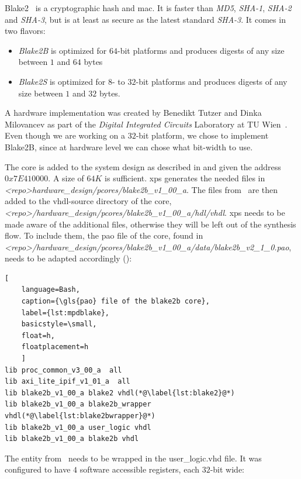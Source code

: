 Blake2~\cite{blake2} is a cryptographic hash and \gls{mac}. It is faster than
\emph{MD5}, \emph{SHA-1}, \emph{SHA-2} and \emph{SHA-3}, but is at least as
secure as the latest standard \emph{SHA-3}.
It comes in two flavors:
\begin{itemize}
	\item \emph{Blake2B} is optimized for $64$-bit platforms and produces
		digests of any size between $1$ and $64$ bytes
	\item \emph{Blake2S} is optimized for $8$- to $32$-bit platforms and
		produces digests of any size between $1$ and $32$ bytes.
\end{itemize}

A hardware implementation was created by Benedikt Tutzer and Dinka Milovancev as
part of the \emph{Digital Integrated Circuits} Laboratory at TU
Wien~\cite{blake2hardware}.
Even though we are working on a $32$-bit platform, we chose to implement
Blake2B, since at hardware level we can chose what bit-width to use.

The core is added to the system design as described in
 and given the address $0x7E410000$. A size of
$64K$ is sufficient.
\gls{xps} generates the needed files in
\emph{<repo>hardware\_design/pcores/blake2b\_v1\_00\_a}.
The files from~\cite{blake2hardware} are then added to the vhdl-source directory
of the core,\\
\emph{<repo>/hardware\_design/pcores/blake2b\_v1\_00\_a/hdl/vhdl}.
\gls{xps} needs to be made aware of the additional files, otherwise they will be
left out of the synthesis flow.
To include them, the \gls{pao} file of the core, found in
\emph{<repo>/hardware\_design/pcores/blake2b\_v1\_00\_a/data/blake2b_v2_1_0.pao},
needs to be adapted accordingly ():

\begin{lstlisting}[
	language=Bash,
	caption={\gls{pao} file of the blake2b core},
	label={lst:mpdblake},
	basicstyle=\small,
	float=h,
	floatplacement=h
	]
lib proc_common_v3_00_a  all 
lib axi_lite_ipif_v1_01_a  all 
lib blake2b_v1_00_a blake2 vhdl(*@\label{lst:blake2}@*)
lib blake2b_v1_00_a blake2b_wrapper vhdl(*@\label{lst:blake2bwrapper}@*)
lib blake2b_v1_00_a user_logic vhdl
lib blake2b_v1_00_a blake2b vhdl
\end{lstlisting}

The entity from~\cite{blake2hardware} needs to be wrapped in the user\_logic.vhd
file.
It was configured to have $4$ software accessible registers, each $32$-bit wide:

